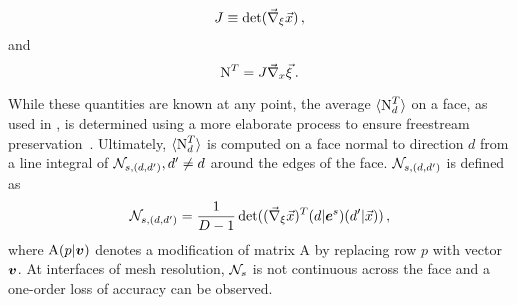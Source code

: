 \begin{equation*}
  J \equiv \det ( {\vec{\nabla}}_{\xi} {\vec{x}} )\,,
\end{equation*}
and
\begin{equation*}
  {\text{N}}^T = J {\vec{\nabla}}_{x} {\vec{\xi}}\,.
\end{equation*}

While these quantities are known at any point, the average $\langle {\text{N}}^T_d\rangle$ on a face, as used in , is determined using a more elaborate process to ensure freestream preservation~\cite{Guzik2015}.
Ultimately, $\langle {\text{N}}^T_d\rangle$ is computed on a face normal to direction $d$ from a line integral of ${\mathcal{N}}_{s,(d,d')}, d' \ne d$ around the edges of the face.
${\mathcal{N}}_{s,(d,d')}$ is defined as
\begin{equation}
  {\mathcal{N}}_{s,(d,d')} = \frac{1}{D - 1}
  \det(({\vec{\nabla}}_{\xi}{\vec{x}})^T(d|{\boldsymbol{e}}^s)(d'|{\vec{x}}))\,,
  \label{eq:pntscrN}
\end{equation}
where $\mathrm{A}(p|{\boldsymbol{v}})$ denotes a modification of matrix $\mathrm{A}$ by replacing row $p$ with vector ${\boldsymbol{v}}$.
At interfaces of mesh resolution, ${\mathcal{N}}_s$ is not continuous across the face and a one-order loss of accuracy can be observed.

